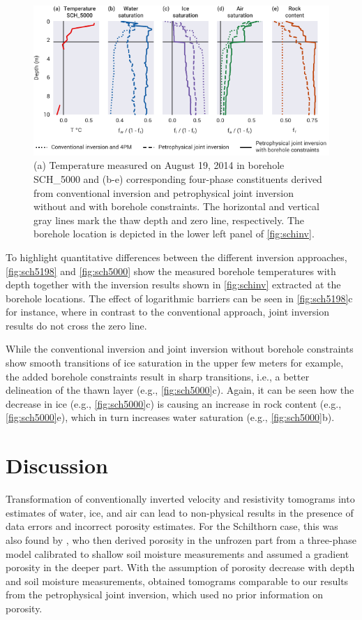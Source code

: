 \documentclass[extra]{gji}
\begin{document}
\begin{figure}
 \centering
 \includegraphics[width=.75\textwidth]{./Fig7_two_columns}
 \caption{(a) Temperature measured on August 19, 2014 in borehole SCH\_5000 and (b-e) corresponding four-phase constituents derived from conventional inversion and petrophysical joint inversion without and with borehole constraints. The horizontal and vertical gray lines mark the thaw depth and zero line, respectively. The borehole location is depicted in the lower left panel of \autoref{fig:schinv}.}
 \label{fig:sch5000}
\end{figure}

To highlight quantitative differences between the different inversion approaches, \autoref{fig:sch5198} and \autoref{fig:sch5000} show the measured borehole temperatures with depth together with the inversion results shown in \autoref{fig:schinv} extracted at the borehole locations.
The effect of logarithmic barriers can be seen in \autoref{fig:sch5198}c for instance, where in contrast to the conventional approach, joint inversion results do not cross the zero line.

While the conventional inversion and joint inversion without borehole constraints show smooth transitions of ice saturation in the upper few meters for example, the added borehole constraints result in sharp transitions, i.e., a better delineation of the thawn layer (e.g., \autoref{fig:sch5000}c).
Again, it can be seen how the decrease in ice (e.g., \autoref{fig:sch5000}c) is causing an increase in rock content (e.g., \autoref{fig:sch5000}e), which in turn increases water saturation (e.g., \autoref{fig:sch5000}b).

\section{Discussion}
Transformation of conventionally inverted velocity and resistivity tomograms into estimates of water, ice, and air can lead to non-physical results in the presence of data errors and incorrect porosity estimates.
For the Schilthorn case, this was also found by \cite{Pellet2016}, who then derived porosity in the unfrozen part from a three-phase model calibrated to shallow soil moisture measurements and assumed a gradient porosity in the deeper part.
With the assumption of porosity decrease with depth and soil moisture measurements, \cite{Pellet2016} obtained tomograms comparable to our results from the petrophysical joint inversion, which used no prior information on porosity.
\end{document}
